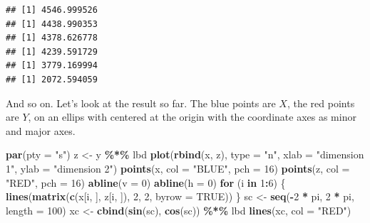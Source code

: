 \documentclass[
  12pt,
]{article}
\newenvironment{Shaded}{\begin{snugshade}}{\end{snugshade}}
\newcommand{\AttributeTok}[1]{\textcolor[rgb]{0.13,0.29,0.53}{#1}}
\newcommand{\ConstantTok}[1]{\textcolor[rgb]{0.56,0.35,0.01}{#1}}
\newcommand{\ControlFlowTok}[1]{\textcolor[rgb]{0.13,0.29,0.53}{\textbf{#1}}}
\newcommand{\DecValTok}[1]{\textcolor[rgb]{0.00,0.00,0.81}{#1}}
\newcommand{\FunctionTok}[1]{\textcolor[rgb]{0.13,0.29,0.53}{\textbf{#1}}}
\newcommand{\NormalTok}[1]{#1}
\newcommand{\OtherTok}[1]{\textcolor[rgb]{0.56,0.35,0.01}{#1}}
\newcommand{\SpecialCharTok}[1]{\textcolor[rgb]{0.81,0.36,0.00}{\textbf{#1}}}
\newcommand{\StringTok}[1]{\textcolor[rgb]{0.31,0.60,0.02}{#1}}
\begin{document}
\begin{verbatim}
## [1] 4546.999526
## [1] 4438.990353
## [1] 4378.626778
## [1] 4239.591729
## [1] 3779.169994
## [1] 2072.594059
\end{verbatim}

And so on. Let's look at the result so far. The blue points are \(X\), the red points are \(Y\),
on an ellips with centered at the origin with the coordinate axes as minor and major axes.

\begin{Shaded}
\begin{Highlighting}[]
\FunctionTok{par}\NormalTok{(}\AttributeTok{pty =} \StringTok{"s"}\NormalTok{)}
\NormalTok{z }\OtherTok{\textless{}{-}}\NormalTok{ y }\SpecialCharTok{\%*\%}\NormalTok{ lbd}
\FunctionTok{plot}\NormalTok{(}\FunctionTok{rbind}\NormalTok{(x, z), }\AttributeTok{type =} \StringTok{"n"}\NormalTok{, }\AttributeTok{xlab =} \StringTok{"dimension 1"}\NormalTok{, }\AttributeTok{ylab =} \StringTok{"dimension 2"}\NormalTok{)}
\FunctionTok{points}\NormalTok{(x, }\AttributeTok{col =} \StringTok{"BLUE"}\NormalTok{, }\AttributeTok{pch =} \DecValTok{16}\NormalTok{)}
\FunctionTok{points}\NormalTok{(z, }\AttributeTok{col =} \StringTok{"RED"}\NormalTok{, }\AttributeTok{pch =} \DecValTok{16}\NormalTok{)}
\FunctionTok{abline}\NormalTok{(}\AttributeTok{v =} \DecValTok{0}\NormalTok{)}
\FunctionTok{abline}\NormalTok{(}\AttributeTok{h =} \DecValTok{0}\NormalTok{)}
\ControlFlowTok{for}\NormalTok{ (i }\ControlFlowTok{in} \DecValTok{1}\SpecialCharTok{:}\DecValTok{6}\NormalTok{) \{}
  \FunctionTok{lines}\NormalTok{(}\FunctionTok{matrix}\NormalTok{(}\FunctionTok{c}\NormalTok{(x[i, ], z[i, ]), }\DecValTok{2}\NormalTok{, }\DecValTok{2}\NormalTok{, }\AttributeTok{byrow =} \ConstantTok{TRUE}\NormalTok{))}
\NormalTok{\}}
\NormalTok{sc }\OtherTok{\textless{}{-}} \FunctionTok{seq}\NormalTok{(}\SpecialCharTok{{-}}\DecValTok{2} \SpecialCharTok{*}\NormalTok{ pi, }\DecValTok{2} \SpecialCharTok{*}\NormalTok{ pi, }\AttributeTok{length =} \DecValTok{100}\NormalTok{)}
\NormalTok{xc }\OtherTok{\textless{}{-}} \FunctionTok{cbind}\NormalTok{(}\FunctionTok{sin}\NormalTok{(sc), }\FunctionTok{cos}\NormalTok{(sc)) }\SpecialCharTok{\%*\%}\NormalTok{ lbd}
\FunctionTok{lines}\NormalTok{(xc, }\AttributeTok{col =} \StringTok{"RED"}\NormalTok{)}
\end{Highlighting}
\end{Shaded}
\end{document}
